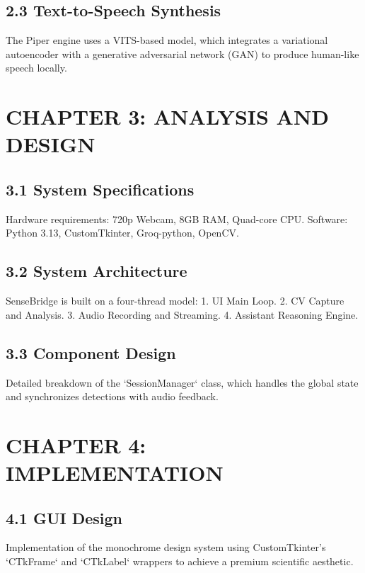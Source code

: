 \documentclass[12pt]{article}
\begin{document}
\subsection*{2.3 Text-to-Speech Synthesis}
The Piper engine uses a VITS-based model, which integrates a variational autoencoder with a generative adversarial network (GAN) to produce human-like speech locally.

\newpage
\section*{CHAPTER 3: ANALYSIS AND DESIGN}

\subsection*{3.1 System Specifications}
Hardware requirements: 720p Webcam, 8GB RAM, Quad-core CPU. Software: Python 3.13, CustomTkinter, Groq-python, OpenCV.

\subsection*{3.2 System Architecture}
SenseBridge is built on a four-thread model:
1. UI Main Loop.
2. CV Capture and Analysis.
3. Audio Recording and Streaming.
4. Assistant Reasoning Engine.

\subsection*{3.3 Component Design}
Detailed breakdown of the `SessionManager` class, which handles the global state and synchronizes detections with audio feedback.

\newpage
\section*{CHAPTER 4: IMPLEMENTATION}

\subsection*{4.1 GUI Design}
Implementation of the monochrome design system using CustomTkinter's `CTkFrame` and `CTkLabel` wrappers to achieve a premium scientific aesthetic.
\end{document}
